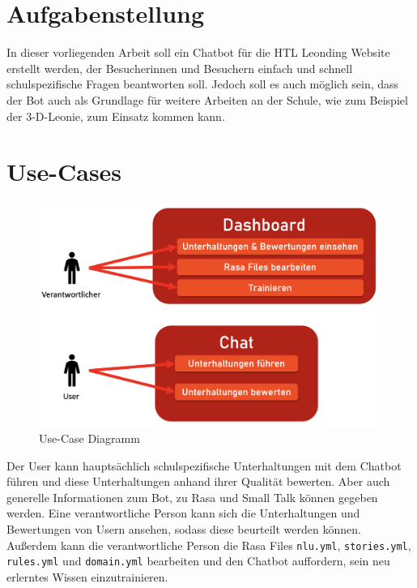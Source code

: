 \section{Aufgabenstellung}
In dieser vorliegenden Arbeit soll ein Chatbot für die HTL Leonding Website erstellt werden, der Besucherinnen und Besuchern einfach und schnell schulspezifische Fragen beantworten soll.
Jedoch soll es auch möglich sein, dass der Bot auch als Grundlage für weitere Arbeiten an der Schule, wie zum Beispiel der 3-D-Leonie, zum Einsatz kommen kann.

\section{Use-Cases}

\begin{figure}[hbt!]
    \centering
    \includegraphics[scale=0.5]{pics/usecase}
    \caption{Use-Case Diagramm}
    \label{fig:impl:usecase}
\end{figure}

Der User kann hauptsächlich schulspezifische Unterhaltungen mit dem Chatbot führen und diese Unterhaltungen anhand ihrer Qualität bewerten.
Aber auch generelle Informationen zum Bot, zu Rasa und Small Talk können gegeben werden.
Eine verantwortliche Person kann sich die Unterhaltungen und Bewertungen von Usern ansehen, sodass diese beurteilt werden können.
Außerdem kann die verantwortliche Person die Rasa Files \texttt{nlu.yml}, \texttt{stories.yml}, \texttt{rules.yml} und \texttt{domain.yml} bearbeiten und den Chatbot auffordern, sein neu erlerntes Wissen einzutrainieren.
